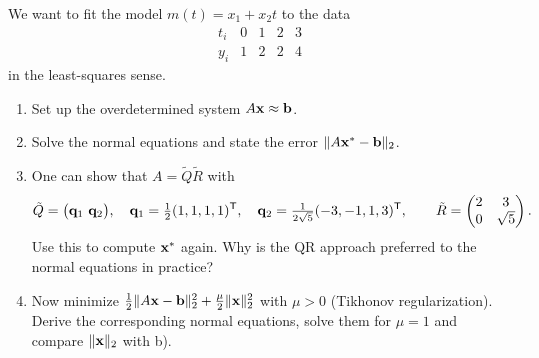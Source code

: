 
\renewcommand{\examletter}{E}

\makeheader

We want to fit the model $m(t)=x_1+x_2t$ to the data
\[
\begin{array}{c|cccc}
t_i&0&1&2&3\\\hline
y_i&1&2&2&4
\end{array}
\]
in the least-squares sense.
\begin{enumerate}
\item Set up the overdetermined system $A\mathbf{x}\approx\mathbf{b}$.
\item Solve the normal equations and state the error $\lVert A\mathbf{x}^*-\mathbf{b}\rVert_2$.
\item One can show that $A=\tilde Q\tilde R$ with
\[
\tilde Q=\big(\mathbf{q}_1\ \mathbf{q}_2\big),\quad \mathbf{q}_1=\tfrac12(1,1,1,1)^{\mathsf{T}},\quad \mathbf{q}_2=\tfrac1{2\sqrt5}(-3,-1,1,3)^{\mathsf{T}},\qquad \tilde R=\begin{pmatrix}2&3\\0&\sqrt5\end{pmatrix}.
\]
Use this to compute $\mathbf{x}^*$ again. Why is the QR approach preferred to the normal equations in practice?
\item Now minimize $\frac12\lVert A\mathbf{x}-\mathbf{b}\rVert_2^2+\frac\mu2\lVert \mathbf{x}\rVert_2^2$ with $\mu>0$ (Tikhonov regularization). Derive the corresponding normal equations, solve them for $\mu=1$ and compare $\lVert \mathbf{x}\rVert_2$ with b).
\end{enumerate}

